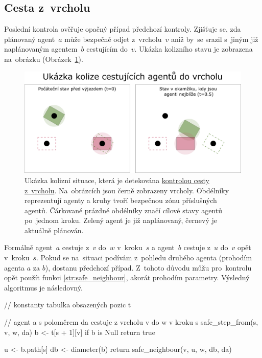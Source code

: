 \subsection{Cesta z~vrcholu}\label{subsec:cesta_z_vrcholu}



Poslední kontrola ověřuje opačný případ předchozí kontroly.
Zjišťuje se, zda plánovaný agent~$a$ může bezpečně odjet z~vrcholu~$v$
aniž by~se srazil s~jiným již naplánovaným agentem~$b$ cestujícím do~$v$.
Ukázka kolizního stavu je zobrazena na~obrázku (Obrázek~\ref{fig:kolize_cesta_z}).

\begin{figure}[h]
	\centering
	\includegraphics[width=\textwidth]{../img/kolize_cesta_z}
	\caption{
		Ukázka kolizní situace, která je detekována \hyperref[subsec:cesta_z_vrcholu]{kontrolou cesty z~vrcholu}.
		Na~obrázcích jsou černě zobrazeny vrcholy.
		Obdélníky reprezentují agenty a kruhy tvoří bezpečnou zónu příslušných agentů.
		Čárkované prázdné obdélníky značí cílové stavy agentů po~jednom kroku.
		Zelený agent je již naplánovaný, černevý je aktuálně plánován.
	}
	\label{fig:kolize_cesta_z}
\end{figure}

Formálně agent~$a$ cestuje z~$v$ do~$w$ v~kroku~$s$ a agent~$b$ cestuje z~$u$ do~$v$ opět v~kroku~$s$.
Pokud se na~situaci podívám z~pohledu druhého agenta (prohodím agenta $a$ za $b$), dostanu předchozí případ.
Z~tohoto důvodu můžu pro~kontrolu opět použít funkci \ref{str:safe_neighbour}, akorát prohodím parametry.
Výsledný algoritmus je následovný.
\begin{code}
// konstanty tabulka obsazených pozic t

// agent a s poloměrem da cestuje z vrcholu v do w v kroku s
safe_step_from(s, v, w, da)
b <- t[s + 1][v]
if b is Null return true

u <- b.path[s]
db <- diameter(b)
return safe_neighbour(v, u, w, db, da)
\end{code}
